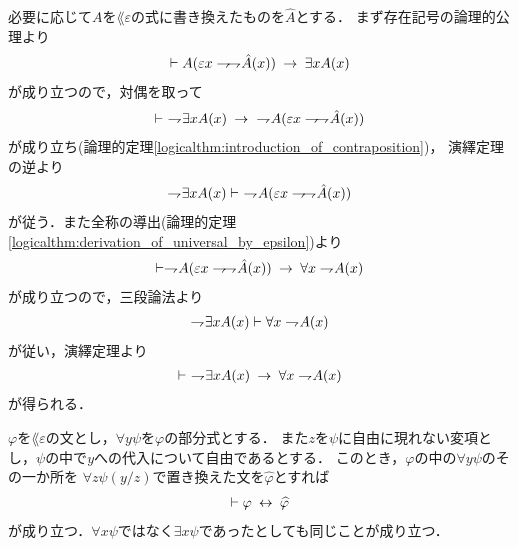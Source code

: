 	\begin{sketch}
		必要に応じて$A$を$\lang{\varepsilon}$の式に書き換えたものを$\hat{A}$とする．
		まず存在記号の論理的公理より
		\begin{align}
			\vdash A(\varepsilon x \rightharpoondown\hspace{-0.25em} \rightharpoondown\hspace{-0.25em} \hat{A}(x))
			\hspace{0.25em}\rightarrow\hspace{0.25em} \exists x A(x)
		\end{align}
		が成り立つので，対偶を取って
		\begin{align}
			\vdash\ \rightharpoondown\hspace{-0.25em} \exists x A(x) 
			\hspace{0.25em}\rightarrow\hspace{0.25em}\ \rightharpoondown\hspace{-0.25em} A(\varepsilon x \rightharpoondown\hspace{-0.25em} \rightharpoondown\hspace{-0.25em} \hat{A}(x))
		\end{align}
		が成り立ち(論理的定理\ref{logicalthm:introduction_of_contraposition})，
		演繹定理の逆より
		\begin{align}
			\rightharpoondown\hspace{-0.25em} \exists x A(x) \vdash\ \rightharpoondown\hspace{-0.25em} A(\varepsilon x \rightharpoondown\hspace{-0.25em} \rightharpoondown\hspace{-0.25em} \hat{A}(x))
		\end{align}
		が従う．また全称の導出(論理的定理\ref{logicalthm:derivation_of_universal_by_epsilon})より
		\begin{align}
			\vdash \rightharpoondown\hspace{-0.25em} A(\varepsilon x \rightharpoondown\hspace{-0.25em} \rightharpoondown\hspace{-0.25em} \hat{A}(x))
			\hspace{0.25em}\rightarrow\hspace{0.25em} \forall x \rightharpoondown\hspace{-0.25em} A(x)
		\end{align}
		が成り立つので，三段論法より
		\begin{align}
			\rightharpoondown\hspace{-0.25em} \exists x A(x) \vdash \forall x \rightharpoondown\hspace{-0.25em} A(x)
		\end{align}
		が従い，演繹定理より
		\begin{align}
			\vdash\ \rightharpoondown\hspace{-0.25em} \exists x A(x) \hspace{0.25em}\rightarrow\hspace{0.25em} \forall x \rightharpoondown\hspace{-0.25em} A(x)
		\end{align}
		が得られる．
		\QED
	\end{sketch}
	
	\begin{screen}
		\begin{logicalthm}[束縛された変項を取り替えても同値]
		\label{logicalthm:equivalence_by_replacing_bound_variables}
			$\varphi$を$\lang{\varepsilon}$の文とし，$\forall y \psi$を$\varphi$の部分式とする．
			また$z$を$\psi$に自由に現れない変項とし，$\psi$の中で$y$への代入について自由であるとする．
			このとき，$\varphi$の中の$\forall y \psi$のその一か所を
			$\forall z \psi(y/z)$で置き換えた文を$\widehat{\varphi}$とすれば
			\begin{align}
				\vdash \varphi \hspace{0.25em}\leftrightarrow\hspace{0.25em} \widehat{\varphi}
			\end{align}
			が成り立つ．$\forall x \psi$ではなく$\exists x \psi$であったとしても同じことが成り立つ．
		\end{logicalthm}
	\end{screen}
	
